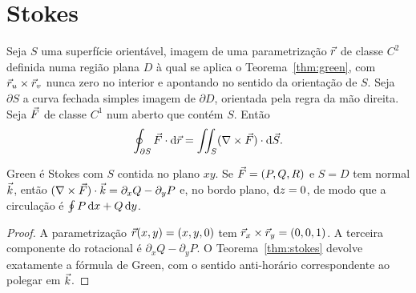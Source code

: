 \documentclass[11pt,a4paper]{article}
\begin{document}
\section{Stokes}

\begin{teorema}
\label{thm:stokes}
Seja $S$ uma superfície orientável, imagem de uma parametrização $\vec{r}$ de classe $C^2$ definida numa região plana $D$ à qual se aplica o Teorema~\ref{thm:green}, com $\vec{r}_u\times\vec{r}_v$ nunca zero no interior e apontando no sentido da orientação de $S$. Seja $\partial S$ a curva fechada simples imagem de $\partial D$, orientada pela regra da mão direita. Seja $\vec{F}$ de classe $C^1$ num aberto que contém $S$. Então
\[
\oint_{\partial S}\vec{F}\cdot\mathrm{d}\vec{r}
=\iint_S(\nabla\times\vec{F})\cdot\mathrm{d}\vec{S}.
\]
\end{teorema}

\begin{corolario}
\label{cor:green-stokes}
Green é Stokes com $S$ contida no plano $xy$. Se $\vec{F}=(P,Q,R)$ e $S=D$ tem normal $\vec{k}$, então $(\nabla\times\vec{F})\cdot\vec{k}=\partial_x Q-\partial_y P$ e, no bordo plano, $\mathrm{d} z=0$, de modo que a circulação é $\oint P\,\mathrm{d} x+Q\,\mathrm{d} y$.
\end{corolario}

\begin{proof}
A parametrização $\vec{r}(x,y)=(x,y,0)$ tem $\vec{r}_x\times\vec{r}_y=(0,0,1)$. A terceira componente do rotacional é $\partial_x Q-\partial_y P$. O Teorema~\ref{thm:stokes} devolve exatamente a fórmula de Green, com o sentido anti-horário correspondente ao polegar em $\vec{k}$.
\end{proof}
\end{document}
